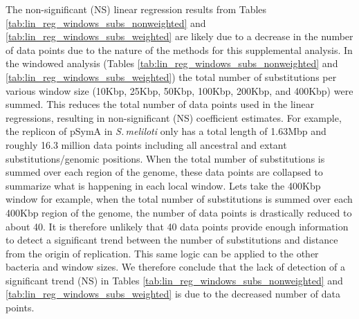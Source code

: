\documentclass[11pt]{article}
\newcommand{\smel}{\textit{S.\,meliloti}\xspace}
\newcommand{\pa}{pSymA\xspace}
\begin{document}
The non-significant (NS) linear regression results from Tables \ref{tab:lin_reg_windows_subs_nonweighted} and \ref{tab:lin_reg_windows_subs_weighted} are likely due to a decrease in the number of data points due to the nature of the methods for this supplemental analysis.
In the windowed analysis (Tables \ref{tab:lin_reg_windows_subs_nonweighted} and \ref{tab:lin_reg_windows_subs_weighted}) the total number of substitutions per various window size (10Kbp, 25Kbp, 50Kbp, 100Kbp, 200Kbp, and 400Kbp) were summed.
This reduces the total number of data points used in the linear regressions, resulting in non-significant (NS) coefficient estimates.
For example, the replicon of \pa in \smel only has a total length of 1.63Mbp and roughly 16.3 million data points  including all ancestral and extant substitutions/genomic positions.
When the total number of substitutions is summed over each region of the genome, these data points are collapsed to summarize what is happening in each local window.
Lets take the 400Kbp window for example, when the total number of substitutions is summed over each 400Kbp region of the genome, the number of data points is drastically reduced to about 40.
It is therefore unlikely that 40 data points provide enough information to detect a significant trend between the number of substitutions and distance from the origin of replication.
This same logic can be applied to the other bacteria and window sizes.
We therefore conclude that the lack of detection of a significant trend (NS) in Tables  \ref{tab:lin_reg_windows_subs_nonweighted} and \ref{tab:lin_reg_windows_subs_weighted} is due to the decreased number of data points.
\end{document}
